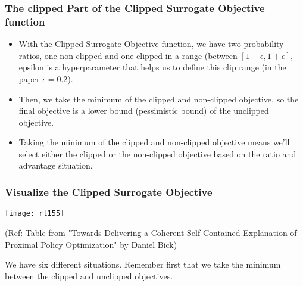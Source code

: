 \begin{frame}[fragile]\frametitle{The clipped Part of the Clipped Surrogate Objective function}

\begin{itemize}
\item With the Clipped Surrogate Objective function, we have two probability ratios, one non-clipped and one clipped in a range (between $[1 - \epsilon, 1 + \epsilon]$, epsilon is a hyperparameter that helps us to define this clip range (in the paper $\epsilon = 0.2$).

\item Then, we take the minimum of the clipped and non-clipped objective, so the final objective is a lower bound (pessimistic bound) of the unclipped objective.

\item Taking the minimum of the clipped and non-clipped objective means we'll select either the clipped or the non-clipped objective based on the ratio and advantage situation.
\end{itemize}


\end{frame}


\begin{frame}[fragile]\frametitle{Visualize the Clipped Surrogate Objective}

\begin{center}
\texttt{[image: rl155]}

{\tiny (Ref: Table from "Towards Delivering a Coherent Self-Contained Explanation of Proximal Policy Optimization" by Daniel Bick)}

\end{center}


We have six different situations. Remember first that we take the minimum between the clipped and unclipped objectives.
\end{frame}


